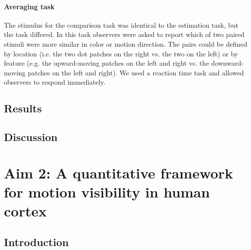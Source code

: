 \documentclass{report}
\begin{document}
\subsubsection{Averaging task}

The stimulus for the comparison task was identical to the estimation task, but the task differed. In this task observers were asked to report which of two paired stimuli were more similar in color or motion direction. The pairs could be defined by location (i.e. the two dot patches on the right vs. the two on the left) or by feature (e.g. the upward-moving patches on the left and right vs. the downward-moving patches on the left and right). We used a reaction time task and allowed observers to respond immediately. 

\section{Results}



\section{Discussion}






\chapter[A framework for motion visibility]{Aim 2: A quantitative framework for motion visibility in human cortex}

\section{Introduction}
\end{document}
